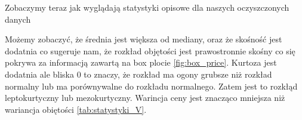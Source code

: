 \documentclass[12pt,leqno]{article}
\theoremstyle{exer}
\begin{document}
		Zobaczymy teraz jak wyglądają statystyki opisowe dla naszych oczyszczonych danych
	
	\begin{table}[H]
		\caption{Podstawowe statystyki opisowe dla objętości}
		\label{tab:statystyki_price}
	\end{table}
	Możemy zobaczyć, że średnia jest większa od mediany, oraz że skośność jest dodatnia co sugeruje nam, że rozkład objętości jest prawostronnie skośny co się pokrywa za informacją zawartą na box plocie \ref{fig:box_price}. Kurtoza jest dodatnia  ale bliska $0$ to znaczy, że rozkład ma ogony grubsze niż rozkład normalny lub ma porównywalne do rozkładu normalnego. Zatem jest to rozkłąd leptokurtyczny lub mezokurtyczny. Warincja ceny jest znacząco mniejsza niż wariancja obiętości \ref{tab:statystyki_V}.  
	
\end{document}
